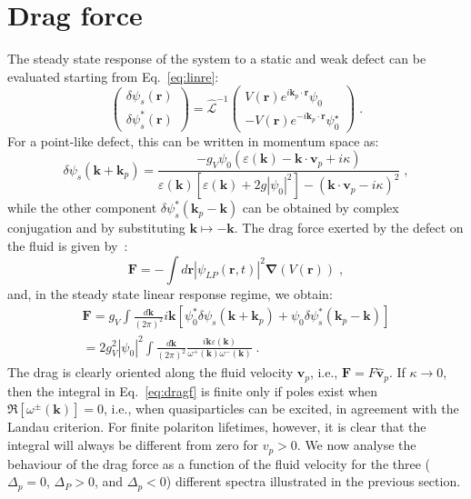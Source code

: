 \section{Drag force}
\label{sec:drag}
%
The steady state response of the system to a static and weak defect
can be evaluated starting from Eq.~\eqref{eq:linre}:
%
\begin{equation*}
  \begin{pmatrix} \delta \psi_s(\bm{r}) \\ \delta
    \psi_s^*(\bm{r}) \end{pmatrix} =
  \hat{\mathcal{L}}^{-1} \begin{pmatrix} V(\bm{r}) e^{i \bm{k}_p
      \cdot \bm{r}} \psi_0 \\ -V(\bm{r}) e^{-i \bm{k}_p \cdot
      \bm{r}} \psi_0^{\star} \end{pmatrix} \; .
\end{equation*}
%
For a point-like defect, this can be written in momentum space as:
%
\begin{equation*}
  \delta \psi_s (\bm{k} + \bm{k}_p) = \frac{-g_V \psi_0
    (\varepsilon(\bm{k}) - \bm{k} \cdot \bm{v}_p +
    i\kappa)}{\varepsilon(\bm{k}) [\varepsilon(\bm{k}) +
      2g|\psi_0|^2] - (\bm{k} \cdot \bm{v}_p - i\kappa)^2} \; ,
\end{equation*}
%
while the other component $\delta \psi_s^* (\bm{k}_p - \bm{k})$
can be obtained by complex conjugation and by substituting $\bm{k}
\mapsto -\bm{k}$. The drag force exerted by the defect on the fluid
is given by~\cite{Astrakharchik_2004}:
%
\begin{equation}
  \bm{F} = - \int d\bm{r} |\psi_{LP}(\bm{r},t)|^2 \bm{\nabla}
  (V(\bm{r})) \; ,
\end{equation}
%
and, in the steady state linear response regime, we obtain:
%
\begin{multline}
  \bm{F} = g_V \int \frac{d\bm{k}}{(2\pi)^2} i\bm{k}
  \left[\psi_0^* \delta\psi_s (\bm{k} + \bm{k}_p) + \psi_0 \delta
    \psi_s^* (\bm{k}_p - \bm{k})\right]\\
%
  = 2g_V^2|\psi_0|^2 \int \frac{d\bm{k}}{(2\pi)^2} \frac{i\bm{k}
    \varepsilon(\bm{k})}{\omega^{+} (\bm{k})\omega^{-} (\bm{k})}
  \; .
    \label{eq:dragf}
\end{multline}
%
The drag is clearly oriented along the fluid velocity $\bm{v}_p$,
i.e., $\bm{F} = F \hat{\bm{v}}_p$. If $\kappa \to 0$, then the
integral in Eq.~\eqref{eq:dragf} is finite only if poles exist when
$\Re [\omega^{\pm} (\bm{k})] = 0$, i.e., when quasiparticles can be
excited, in agreement with the Landau criterion. For finite polariton
lifetimes, however, it is clear that the integral will always be
different from zero for $v_p>0$.
We now analyse the behaviour of the drag force as a function of the
fluid velocity for the three ($\Delta_p = 0$, $\Delta_P > 0$, and
$\Delta_p < 0$) different spectra illustrated in the previous section.

